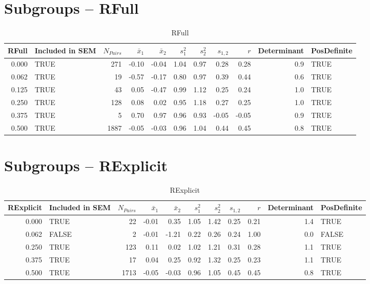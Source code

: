 \documentclass{article}\usepackage[]{graphicx}\usepackage[]{color}
\begin{document}
\section{Subgroups --  RFull }%
\begin{table}[ht]
\centering
\begin{tabular}{rlrrrrrrrrl}
  \hline
RFull & Included in SEM & $N_{Pairs}$ & $\bar{x}_1$ & $\bar{x}_2$ & $s_1^2$ & $s_2^2$ & $s_{1,2}$ & $r$ & Determinant & PosDefinite \\ 
  \hline
0.000 & TRUE & 271 & -0.10 & -0.04 & 1.04 & 0.97 & 0.28 & 0.28 & 0.9 & TRUE \\ 
  0.062 & TRUE & 19 & -0.57 & -0.17 & 0.80 & 0.97 & 0.39 & 0.44 & 0.6 & TRUE \\ 
  0.125 & TRUE & 43 & 0.05 & -0.47 & 0.99 & 1.12 & 0.25 & 0.24 & 1.0 & TRUE \\ 
  0.250 & TRUE & 128 & 0.08 & 0.02 & 0.95 & 1.18 & 0.27 & 0.25 & 1.0 & TRUE \\ 
  0.375 & TRUE & 5 & 0.70 & 0.97 & 0.96 & 0.93 & -0.05 & -0.05 & 0.9 & TRUE \\ 
  0.500 & TRUE & 1887 & -0.05 & -0.03 & 0.96 & 1.04 & 0.44 & 0.45 & 0.8 & TRUE \\ 
   \hline
\end{tabular}
\caption{RFull} 
\end{table}
\section{Subgroups --  RExplicit }%
\begin{table}[ht]
\centering
\begin{tabular}{rlrrrrrrrrl}
  \hline
RExplicit & Included in SEM & $N_{Pairs}$ & $\bar{x}_1$ & $\bar{x}_2$ & $s_1^2$ & $s_2^2$ & $s_{1,2}$ & $r$ & Determinant & PosDefinite \\ 
  \hline
0.000 & TRUE & 22 & -0.01 & 0.35 & 1.05 & 1.42 & 0.25 & 0.21 & 1.4 & TRUE \\ 
  0.062 & FALSE & 2 & -0.01 & -1.21 & 0.22 & 0.26 & 0.24 & 1.00 & 0.0 & FALSE \\ 
  0.250 & TRUE & 123 & 0.11 & 0.02 & 1.02 & 1.21 & 0.31 & 0.28 & 1.1 & TRUE \\ 
  0.375 & TRUE & 17 & 0.04 & 0.25 & 0.92 & 1.32 & 0.25 & 0.23 & 1.1 & TRUE \\ 
  0.500 & TRUE & 1713 & -0.05 & -0.03 & 0.96 & 1.05 & 0.45 & 0.45 & 0.8 & TRUE \\ 
   \hline
\end{tabular}
\caption{RExplicit} 
\end{table}
\end{document}
